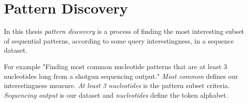 
\section{Pattern Discovery}

In this thesis \emph{pattern discovery} is a process of finding the most interesting subset of sequential patterns, according to some query interestingness, in a sequence dataset.


For example "Finding most common nucleotide patterns that are at least 3 nucleotides long from a shotgun sequencing output." \emph{Most common} defines our interestingness measure. \emph{At least 3 nucleotides} is the pattern subset criteria. \emph{Sequencing output} is our dataset and \emph{nucleotides} define the token alphabet.